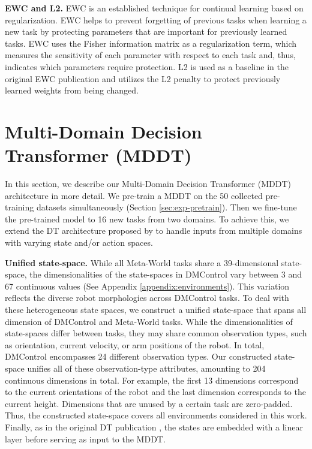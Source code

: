 \textbf{EWC and L2.} EWC \citep{Kirkpatrick:17} is an established technique for continual learning based on regularization. EWC helps to prevent forgetting of previous tasks when learning a new task by protecting parameters that are important for previously learned tasks. EWC uses the Fisher information matrix as a regularization term, which measures the sensitivity of each parameter with respect to each task and, thus, indicates which parameters require protection. L2 is used as a baseline in the original EWC publication \citep{Kirkpatrick:17} and utilizes the L2 penalty to protect previously learned weights from being changed. 

\section{Multi-Domain Decision Transformer (MDDT)}\label{appendix:mddt}
In this section, we describe our Multi-Domain Decision Transformer (MDDT) architecture in more detail.
We pre-train a MDDT on the 50 collected pre-training datasets simultaneously (Section \ref{sec:exp-pretrain}). Then we fine-tune the pre-trained model to 16 new tasks from two domains. 
To achieve this, we extend the DT architecture proposed by \citet{Chen:21} to handle inputs from multiple domains with varying state and/or action spaces.

\textbf{Unified state-space.} 
While all Meta-World tasks share a 39-dimensional state-space, the dimensionalities of the state-spaces in DMControl vary between 3 and 67 continuous values (See Appendix \ref{appendix:environments}). This variation reflects the diverse robot morphologies across DMControl tasks. 
To deal with these heterogeneous state spaces, we construct a unified state-space that spans all dimension of DMControl and Meta-World tasks. While the dimensionalities of state-spaces differ between tasks, they may share common observation types, such as orientation, current velocity, or arm positions of the robot. In total, DMControl encompasses 24 different observation types. Our constructed state-space unifies all of these observation-type attributes, amounting to 204 continuous dimensions in total. For example, the first 13 dimensions correspond to the current orientations of the robot and the last dimension corresponds to the current height. Dimensions that are unused by a certain task are zero-padded.
Thus, the constructed state-space covers all environments considered in this work. Finally, as in the original DT publication \citep{Chen:21}, the states are embedded with a linear layer before serving as input to the MDDT.

